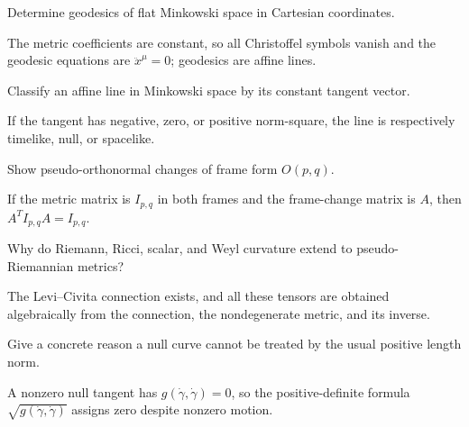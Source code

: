 \begin{problem}\label{prob:vii29-08}
Determine geodesics of flat Minkowski space in Cartesian coordinates.
\end{problem}
\begin{solution}
The metric coefficients are constant, so all Christoffel symbols vanish and the geodesic equations are \(\ddot x^\mu=0\); geodesics are affine lines.
\end{solution}

\begin{problem}\label{prob:vii29-09}
Classify an affine line in Minkowski space by its constant tangent vector.
\end{problem}
\begin{solution}
If the tangent has negative, zero, or positive norm-square, the line is respectively timelike, null, or spacelike.
\end{solution}

\begin{problem}\label{prob:vii29-10}
Show pseudo-orthonormal changes of frame form \(O(p,q)\).
\end{problem}
\begin{solution}
If the metric matrix is \(I_{p,q}\) in both frames and the frame-change matrix is \(A\), then \(A^TI_{p,q}A=I_{p,q}\).
\end{solution}

\begin{problem}\label{prob:vii29-11}
Why do Riemann, Ricci, scalar, and Weyl curvature extend to pseudo-Riemannian metrics?
\end{problem}
\begin{solution}
The Levi--Civita connection exists, and all these tensors are obtained algebraically from the connection, the nondegenerate metric, and its inverse.
\end{solution}

\begin{problem}\label{prob:vii29-12}
Give a concrete reason a null curve cannot be treated by the usual positive length norm.
\end{problem}
\begin{solution}
A nonzero null tangent has \(g(\dot\gamma,\dot\gamma)=0\), so the positive-definite formula \(\sqrt{g(\dot\gamma,\dot\gamma)}\) assigns zero despite nonzero motion.
\end{solution}

